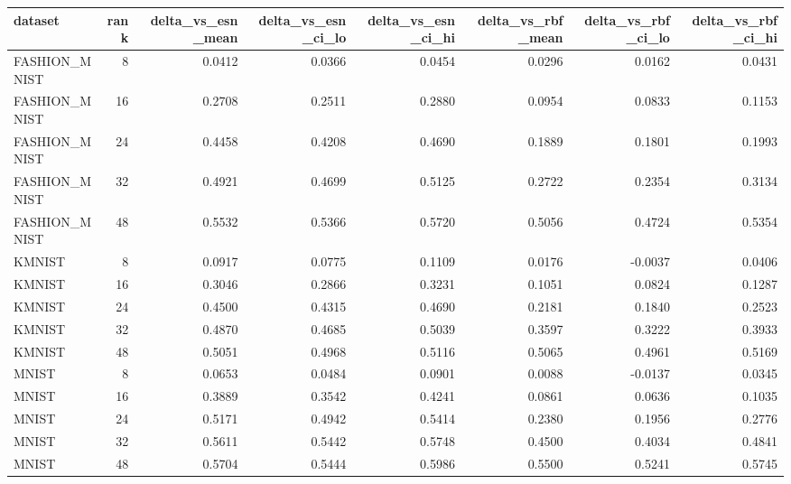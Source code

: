\begin{tabular}{lrrrrrrr}
\toprule
dataset & rank & delta_vs_esn_mean & delta_vs_esn_ci_lo & delta_vs_esn_ci_hi & delta_vs_rbf_mean & delta_vs_rbf_ci_lo & delta_vs_rbf_ci_hi \\
\midrule
FASHION_MNIST & 8 & 0.0412 & 0.0366 & 0.0454 & 0.0296 & 0.0162 & 0.0431 \\
FASHION_MNIST & 16 & 0.2708 & 0.2511 & 0.2880 & 0.0954 & 0.0833 & 0.1153 \\
FASHION_MNIST & 24 & 0.4458 & 0.4208 & 0.4690 & 0.1889 & 0.1801 & 0.1993 \\
FASHION_MNIST & 32 & 0.4921 & 0.4699 & 0.5125 & 0.2722 & 0.2354 & 0.3134 \\
FASHION_MNIST & 48 & 0.5532 & 0.5366 & 0.5720 & 0.5056 & 0.4724 & 0.5354 \\
KMNIST & 8 & 0.0917 & 0.0775 & 0.1109 & 0.0176 & -0.0037 & 0.0406 \\
KMNIST & 16 & 0.3046 & 0.2866 & 0.3231 & 0.1051 & 0.0824 & 0.1287 \\
KMNIST & 24 & 0.4500 & 0.4315 & 0.4690 & 0.2181 & 0.1840 & 0.2523 \\
KMNIST & 32 & 0.4870 & 0.4685 & 0.5039 & 0.3597 & 0.3222 & 0.3933 \\
KMNIST & 48 & 0.5051 & 0.4968 & 0.5116 & 0.5065 & 0.4961 & 0.5169 \\
MNIST & 8 & 0.0653 & 0.0484 & 0.0901 & 0.0088 & -0.0137 & 0.0345 \\
MNIST & 16 & 0.3889 & 0.3542 & 0.4241 & 0.0861 & 0.0636 & 0.1035 \\
MNIST & 24 & 0.5171 & 0.4942 & 0.5414 & 0.2380 & 0.1956 & 0.2776 \\
MNIST & 32 & 0.5611 & 0.5442 & 0.5748 & 0.4500 & 0.4034 & 0.4841 \\
MNIST & 48 & 0.5704 & 0.5444 & 0.5986 & 0.5500 & 0.5241 & 0.5745 \\
\bottomrule
\end{tabular}

